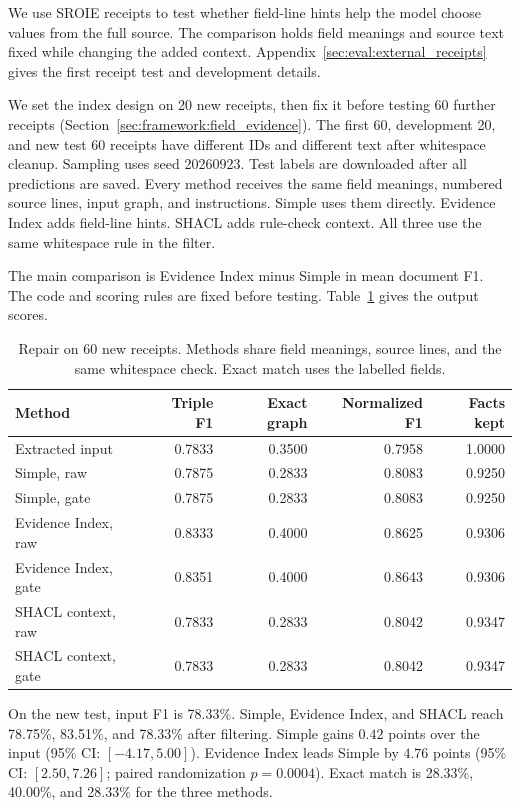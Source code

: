 We use SROIE receipts \citep{ref_sroie2019} to test whether field-line
hints help the model choose values from the full source.
The comparison holds field meanings and source text fixed while changing
the added context. Appendix~\ref{sec:eval:external_receipts} gives the first
receipt test and development details.

We set the index design on 20 new receipts, then fix it before testing 60
further receipts (Section~\ref{sec:framework:field_evidence}).
The first 60, development 20, and new test 60 receipts have different IDs
and different text after whitespace cleanup. Sampling uses seed 20260923.
Test labels are downloaded after all predictions are saved.
Every method receives the same field meanings, numbered source lines,
input graph, and instructions. Simple uses them directly.
Evidence Index adds field-line hints. SHACL adds rule-check context.
All three use the same whitespace rule in the filter.

The main comparison is Evidence Index minus Simple in mean document F1.
The code and scoring rules are fixed before testing.
Table~\ref{tab:receipt_followup} gives the output scores.

\begin{table}[t]
\centering
\caption{Repair on 60 new receipts. Methods share field meanings, source lines, and the same whitespace check. Exact match uses the labelled fields.}
\label{tab:receipt_followup}
\small
\begin{tabular}{lrrrr}
\toprule
Method & Triple F1 & Exact graph & Normalized F1 & Facts kept \\
\midrule
Extracted input & 0.7833 & 0.3500 & 0.7958 & 1.0000 \\
Simple, raw & 0.7875 & 0.2833 & 0.8083 & 0.9250 \\
Simple, gate & 0.7875 & 0.2833 & 0.8083 & 0.9250 \\
Evidence Index, raw & 0.8333 & 0.4000 & 0.8625 & 0.9306 \\
Evidence Index, gate & 0.8351 & 0.4000 & 0.8643 & 0.9306 \\
SHACL context, raw & 0.7833 & 0.2833 & 0.8042 & 0.9347 \\
SHACL context, gate & 0.7833 & 0.2833 & 0.8042 & 0.9347 \\
\bottomrule
\end{tabular}
\end{table}

On the new test, input F1 is 78.33\%. Simple, Evidence Index, and SHACL
reach 78.75\%, 83.51\%, and 78.33\% after filtering.
Simple gains $0.42$ points over the input (95\% CI: $[-4.17,5.00]$).
Evidence Index leads Simple by $4.76$ points
(95\% CI: $[2.50,7.26]$; paired randomization $p=0.0004$).
Exact match is 28.33\%, 40.00\%, and 28.33\% for the three methods.

